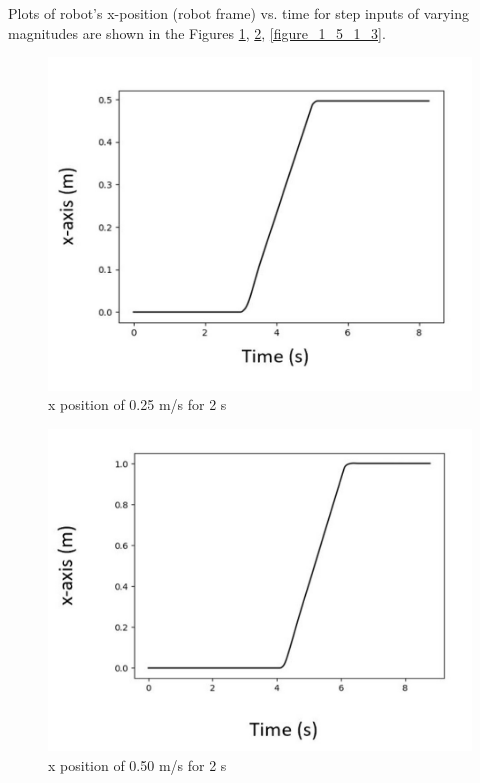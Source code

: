 \documentclass[journal]{IEEEtran}
\begin{document}
Plots of robot’s x-position (robot frame) vs. time for step inputs of varying magnitudes are shown in the Figures \ref{figure_1_5_1_1}, \ref{figure_1_5_1_2}, \ref{figure_1_5_1_3}.

\begin{figure}[h]
\begin{center}
\includegraphics[width=0.8\linewidth]{image_1/figure_1_5_1_1.jpg}
\end{center}
   \caption{x position of 0.25 m/s for 2 s}
   \label{figure_1_5_1_1}
\end{figure}

\begin{figure}[h]
\begin{center}
\includegraphics[width=0.8\linewidth]{image_1/figure_1_5_1_2.jpg}
\end{center}
   \caption{x position of 0.50 m/s for 2 s}
   \label{figure_1_5_1_2}
\end{figure}
\end{document}
